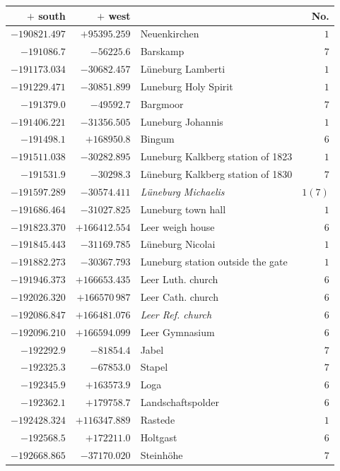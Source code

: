 \clearpage
\begin{center}\begingroup\fontsize{8}{9}\selectfont
\setlength{\tabcolsep}{4pt}
\begin{tabular}{r|r|p{170pt}|r}\hline
\(+\) south&\(+\) west&&No.\\\hline
\(-190821.497\)&\(+95395.259\)&Neuenkirchen&\(1\)\\
\(-191086.7\)&\(-56225.6\)&Barskamp&\(7\)\\
\(-191173.034\)&\(-30682.457\)&Lüneburg Lamberti&\(1\)\\
\(-191229.471\)&\(-30851.899\)&Luneburg Holy Spirit&\(1\)\\
\(-191379.0\)&\(-49592.7\)&Bargmoor&\(7\)\\
\(-191406.221\)&\(-31356.505\)&Luneburg Johannis&\(1\)\\
\(-191498.1\)&\(+168950.8\)&Bingum&\(6\)\\
\(-191511.038\)&\(-30282.895\)&Luneburg Kalkberg station of 1823&\(1\)\\
\(-191531.9\)&\(-30298.3\)&Lüneburg Kalkberg station of 1830&\(7\)\\
\(-191597.289\)&\(-30574.411\)&\textit{Lüneburg Michaelis}&\(1 (7)\)\\
\(-191686.464\)&\(-31027.825\)&Luneburg town hall&\(1\)\\
\(-191823.370\)&\(+166412.554\)&Leer weigh house&\(6\)\\
\(-191845.443\)&\(-31169.785\)&Lüneburg Nicolai&\(1\)\\
\(-191882.273\)&\(-30367.793\)&Luneburg station outside the gate&\(1\)\\
\(-191946.373\)&\(+166653.435\)&Leer Luth. church&\(6\)\\
\(-192026.320\)&\(+166570\,987\)&Leer Cath. church&\(6\)\\
\(-192086.847\)&\(+166481.076\)&\textit{Leer Ref. church}&\(6\)\\
\(-192096.210\)&\(+166594.099\)&Leer Gymnasium&\(6\)\\
\(-192292.9\)&\(-81854.4\)&Jabel&\(7\)\\
\(-192325.3\)&\(-67853.0\)&Stapel&\(7\)\\
\(-192345.9\)&\(+163573.9\)&Loga&\(6\)\\
\(-192362.1\)&\(+179758.7\)&Landschaftspolder&\(6\)\\
\(-192428.324\)&\(+116347.889\)&Rastede&\(1\)\\
\(-192568.5\)&\(+172211.0\)&Holtgast&\(6\)\\
\(-192668.865\)&\(-37170.020\)&Steinhöhe&\(7\)\\

\end{tabular}
\end{center}
